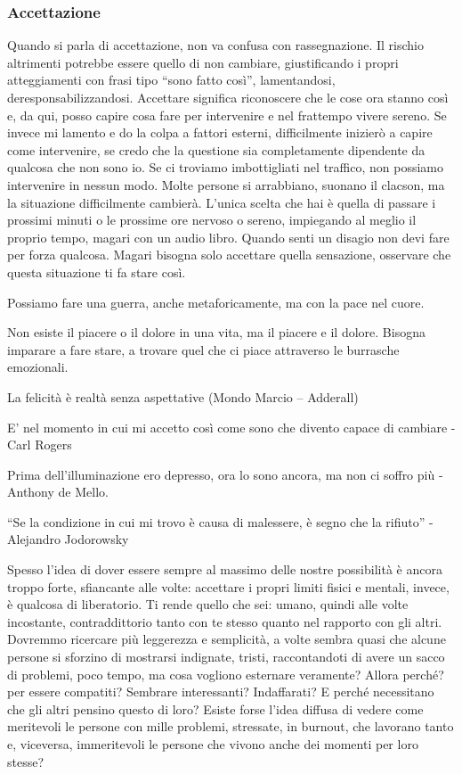 \documentclass[12pt]{book} %
\begin{document}
\subsubsection{Accettazione}
Quando si parla di accettazione, non va confusa con rassegnazione. Il rischio altrimenti potrebbe essere quello di
non cambiare, giustificando i propri atteggiamenti con frasi tipo “sono fatto così”, lamentandosi, deresponsabilizzandosi. Accettare significa riconoscere
che le cose ora stanno così e, da qui, posso capire cosa fare per intervenire e nel frattempo vivere sereno. Se invece mi lamento e do la colpa a fattori esterni, difficilmente inizierò a capire come intervenire, se credo che la questione sia completamente dipendente da qualcosa che non sono io. Se ci
troviamo imbottigliati nel traffico, non possiamo intervenire in nessun modo. Molte persone si arrabbiano, suonano il
clacson, ma la situazione difficilmente cambierà. L'unica scelta che hai è quella di passare i prossimi
minuti o le prossime ore nervoso o sereno, impiegando al meglio il proprio tempo, magari con un audio libro. 
Quando senti un disagio non devi fare per forza qualcosa. Magari bisogna solo accettare quella sensazione, osservare che
questa situazione ti fa stare così.

Possiamo fare una guerra, anche metaforicamente, ma con la pace nel cuore.

Non esiste il piacere o il dolore in una vita, ma il piacere e il dolore. Bisogna imparare a fare stare, a trovare quel
che ci piace attraverso le burrasche emozionali.

La felicità è realtà senza aspettative (Mondo Marcio – Adderall)

E' nel momento in cui mi accetto così come sono che divento capace di cambiare - Carl Rogers

Prima dell'illuminazione ero depresso, ora lo sono ancora, ma non ci soffro più - Anthony de Mello.

“Se la condizione in cui mi trovo è causa di malessere, è segno che la rifiuto” - Alejandro Jodorowsky

Spesso l'idea di dover essere sempre al massimo delle nostre possibilità è ancora
troppo forte, sfiancante alle volte: accettare i propri limiti fisici e mentali, invece, è qualcosa di liberatorio. Ti
rende quello che sei: umano, quindi alle volte incostante, contraddittorio tanto con te stesso quanto nel rapporto con
gli altri. Dovremmo ricercare più
leggerezza e semplicità, a volte sembra quasi che alcune persone si sforzino di mostrarsi indignate, tristi,
raccontandoti di avere un sacco di problemi, poco tempo, ma cosa vogliono esternare veramente? 
Allora perché? per essere compatiti? Sembrare interessanti? Indaffarati? E perché necessitano che gli
altri pensino questo di loro? Esiste forse l'idea diffusa di vedere come meritevoli le persone con mille problemi,
stressate, in burnout, che lavorano tanto e, viceversa, immeritevoli le persone che vivono anche dei momenti per loro stesse?
\end{document}
